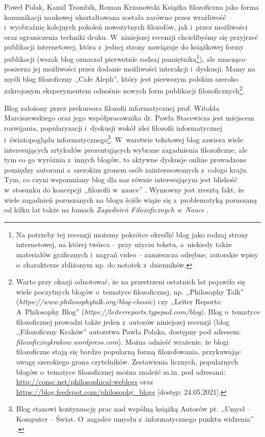 \begin{newrevplenv}{Paweł Polak, Kamil Trombik, Roman Krzanowski}
Książka filozoficzna jako forma komunikacji naukowej ukształtowana została zarówno przez wrażliwość i~wyobraźnię kolejnych pokoleń nowożytnych filozofów, jak i~przez możliwości oraz ograniczenia techniki druku. W~niniejszej recenzji chcielibyśmy się przyjrzeć publikacji internetowej, która z~jednej strony nawiązuje do książkowej formy publikacji (wszak blog oznaczał pierwotnie rodzaj pamiętnika\footnote{Na potrzeby tej recenzji możemy pokrótce określić blog jako rodzaj strony internetowej, na której twórca -- przy użyciu tekstu, a~niekiedy także materiałów graficznych i~nagrań video -- zamieszcza odrębne, autorskie wpisy o~charakterze zbliżonym np. do notatek z~dzienników.}), ale znacząco poszerza jej możliwości przez dodanie możliwości interakcji i~dyskusji. Mamy na myśli blog filozoficzny ,,Cafe Aleph'', który jest pierwszym polskim szeroko zakrojonym eksperymentem odnośnie nowych form publikacji filozoficznych\footnote{Warto przy okazji odnotować, że na przestrzeni ostatnich lat pojawiło się wiele poczytnych blogów o~tematyce filozoficznej, np. ,,Philosophy Talk'' (\textit{https://www.philosophytalk.org/blog-classic}) czy ,,Leiter Reports: A~Philosophy Blog'' (\textit{https://leiterreports.typepad.com/blog}). Blog o~tematyce filozoficznej prowadzi także jeden z~autorów niniejszej recenzji (blog ,,Filozoficzny Kraków'' autorstwa Pawła Polaka, dostępny pod adresem: \textit{filozoficznykrakow.wordpress.com}). Można odnieść wrażenie, że blogi filozoficzne stają się bardzo popularną formą filozofowania, przykuwając uwagę szerokiego grona czytelników. Zestawienia licznych, popularnych blogów o~tematyce filozoficznej można znaleźć m.in. pod adresami: \url{http://consc.net/philosophical-weblogs} oraz \url{https://blog.feedspot.com/philosophy_blogs} [dostęp: 24.05.2021].}.

Blog założony przez prekursora filozofii informatycznej prof. Witolda Marciszewskiego oraz jego współpracownika dr. Pawła Stacewicza jest miejscem rozwijania, popularyzacji i~dyskusji wokół idei filozofii informatycznej i~światopoglądu informatycznego\footnote{Blog stanowi kontynuację prac nad wspólną książką Autorów pt. ,,Umysł – Komputer – Świat. O~zagadce umysłu z~informatycznego punktu widzenia''
\parencite{marciszewski_2011}.%
}. W~warstwie tekstowej blog zawiera wiele interesujących artykułów prezentujących wybrane zagadnienia filozoficzne, ale tym co go wyróżnia z~innych blogów, to aktywne dyskusje online prowadzone pomiędzy autorami a~szerokim gronem osób zainteresowanych z~całego kraju. Tym, co czyni wspomniany blog dla nas równie interesującym jest bliskość w~stosunku do koncepcji ,,filozofii w~nauce''
\parencites[][]{heller_how_2019}[cf.][]{polak_philosophy_2019}.
Wymowny jest zresztą fakt, że wiele zagadnień poruszanych na blogu ściśle wiąże się z~problematyką poruszaną od kilku lat także na łamach \textit{Zagadnień Filozoficznych w~Nauce}
\parencites{leciejewski_structure_2018}{krzanowski_why_2020}{krzanowski_minimal_2017}{krzanowski_towards_2016}{kycia_information_2020}{kycia_information_2021}.


\end{newrevplenv}
